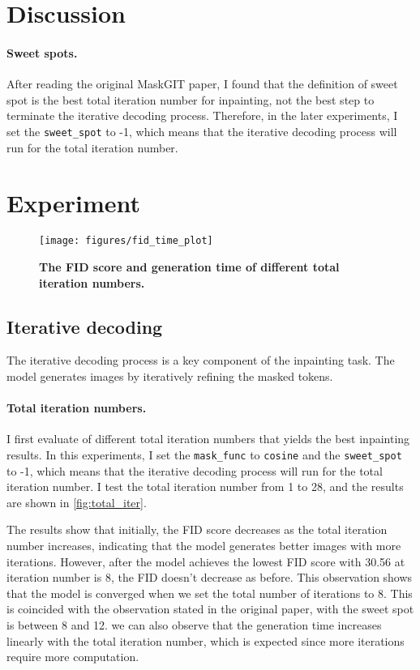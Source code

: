 \documentclass[twocolumn,a4paper]{article}
\begin{document}
\section{Discussion}

\paragraph{Sweet spots.} After reading the original MaskGIT\cite{chang2022maskgit} paper, I found that the definition of sweet spot is the best total iteration number for inpainting, not the best step to terminate the iterative decoding process. Therefore, in the later experiments, I set the \texttt{sweet\_spot} to -1, which means that the iterative decoding process will run for the total iteration number.

\section{Experiment}

\begin{figure*}[t]
    \centering
    \texttt{[image: figures/fid\_time\_plot]}
    \caption{\textbf{The FID score and generation time of different total iteration numbers.}}
    \label{fig:total_iter}
\end{figure*}

\subsection{Iterative decoding}
The iterative decoding process is a key component of the inpainting task. The model generates images by iteratively refining the masked tokens. 

\paragraph{Total iteration numbers.} I first evaluate of different total iteration numbers that yields the best inpainting results. In this experiments, I set the \texttt{mask\_func} to \texttt{cosine} and the \texttt{sweet\_spot} to -1, which means that the iterative decoding process will run for the total iteration number. I test the total iteration number from 1 to 28, and the results are shown in \autoref{fig:total_iter}.



The results show that initially, the FID score decreases as the total iteration number increases, indicating that the model generates better images with more iterations. However, after the model achieves the lowest FID score with 30.56 at iteration number is 8, the FID doesn't decrease as before. This observation shows that the model is converged when we set the total number of iterations to 8. This is coincided with the observation stated in the original paper, with the sweet spot is between 8 and 12. we can also observe that the generation time increases linearly with the total iteration number, which is expected since more iterations require more computation.
\end{document}
